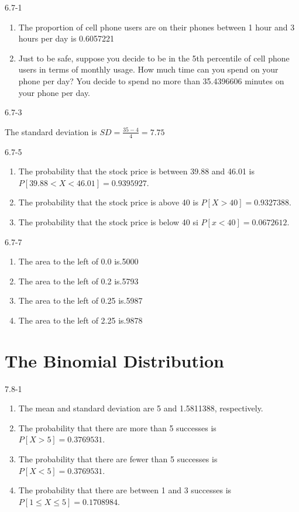 \begin{exsol@solution}{6.7-1}

\begin{enumerate}
	\item The proportion of cell phone users are on their phones between 1 hour
and 3 hours per day is 0.6057221
  \item Just to be safe, suppose you decide to be in the 5th percentile of
cell phone users in terms of monthly usage.  How much time can you spend on your phone per day? You decide to spend no more than 35.4396606 minutes on your phone per day.
	\end{enumerate}
\end{exsol@solution}
\begin{exsol@solution}{6.7-3}


    The standard deviation is $SD = \frac{35 - 4}{4} = 7.75$
\end{exsol@solution}
\begin{exsol@solution}{6.7-5}

\begin{enumerate}
\item The probability that the stock price is between 39.88 and 46.01 is $P[39.88 < X < 46.01] = 0.9395927$.
\item The probability that the stock price is above 40 is $P[X > 40] = 0.9327388$.
\item The probability that the stock price is below 40 si $P[ x < 40] = 0.0672612$.
\end{enumerate}
\end{exsol@solution}
\begin{exsol@solution}{6.7-7}
\begin{enumerate}
\item The area to the left of 0.0 is.5000
\item The area to the left of 0.2 is.5793
\item The area to the left of 0.25 is.5987
\item The area to the left of 2.25 is.9878
\end{enumerate}
\end{exsol@solution}
\setcounter{chapter}{7}\chapter{The Binomial Distribution}
\begin{exsol@solution}{7.8-1}

		\begin{enumerate}
	  \item The mean and standard deviation are 5 and 1.5811388, respectively.
    \item The probability that there are more than 5 successes is $P[ X > 5 ] = 0.3769531$.
    \item The probability that there are fewer than 5 successes is $P[ X < 5 ] = 0.3769531$.
    \item The probability that there  are between 1 and 3 successes  is $P[ 1 \le X \le 5 ] = 0.1708984$.
	  \end{enumerate}
\end{exsol@solution}
